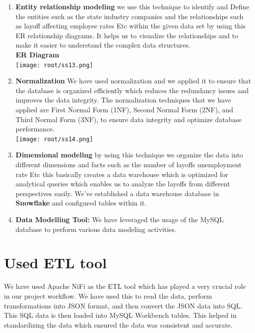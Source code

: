 \begin{enumerate}
    \item \textbf{Entity relationship modeling} we use this technique to identify and Define the entities such as the state industry companies and the relationships such as layoff affecting employee rates Etc within the given data set by using this ER relationship diagrams. It helps us to visualize the relationships and to make it easier to understand the complex data structures.\\[1cm]
\textbf{{ER Diagram}}\\

\texttt{[image: root/ss13.png]}~\\


\item \textbf{Normalization} We have used normalization and we applied it to ensure that the database is organized efficiently which reduces the redundancy issues and improves the data integrity. The normalization techniques that we have applied are First Normal Form (1NF), Second Normal Form (2NF), and Third Normal Form (3NF), to ensure data integrity and optimize database performance.\\
\texttt{[image: root/ss14.png]}~\\

\item \textbf{Dimensional modeling} by using this technique we organize the data into different dimensions and facts such as the number of layoffs unemployment rate Etc this basically creates a data warehouse which is optimized for analytical queries which enables us to analyze the layoffs from different perspectives easily. We've established a data warehouse database in \textbf{Snowflake} and configured tables within it. 
\\

\item \textbf{Data Modelling Tool:} We have leveraged the usage of the MySQL database to perform various data modeling activities.\\

\end{enumerate}

\section{\Large\textbf{Used ETL tool}}
{We have used Apache NiFi as the ETL tool which has played a very crucial role in our project workflow. We have used this to read the data, perform transformations into JSON format, and then convert the JSON data into SQL. This SQL data is then loaded into MySQL Workbench tables. This helped in standardizing the data which ensured the data was consistent and accurate.}\\

